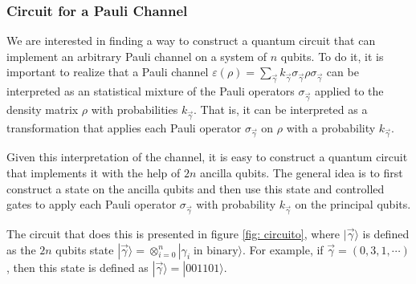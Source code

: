 \subsubsection{Circuit for a Pauli Channel}

We are interested in finding a way to construct a quantum circuit that can implement an arbitrary Pauli channel on a system of $n$ qubits. To do it, it is important to realize that a Pauli channel $\varepsilon (\rho) = \sum_{\vec{\gamma}} k_{\vec{\gamma}} \sigma_{\vec{\gamma}} \rho \sigma_{\vec{\gamma}}$ can be interpreted as an statistical mixture of the Pauli operators $\sigma_{\vec{\gamma}}$ applied to the density matrix $\rho$  with  probabilities $k_{\vec{\gamma}}$. That is, it can be interpreted as a transformation that applies each Pauli operator $\sigma_{\vec{\gamma}}$ on $\rho$ with a probability $k_{\vec{\gamma}}$.

Given this interpretation of the channel, it is easy to construct a quantum circuit that implements it with the help of $2n$ ancilla qubits. The general idea is to first construct a state on the ancilla qubits and then use this state and controlled gates to  apply each Pauli operator $\sigma_{\vec{\gamma}}$ with probability $k_{\vec{\gamma}}$ on the principal qubits. 

The circuit that does this is presented in figure \ref{fig: circuito}, where $|\vec{\gamma}\rangle$ is defined as the $2n$ qubits state $|\vec{\gamma} \rangle = \otimes_{i=0}^n |\gamma_i \; \text{in binary} \rangle$. For example, if $\vec{\gamma} = (0,3,1,\cdots)$, then this state is defined as $|\vec{\gamma} \rangle = |001101 \rangle$.

